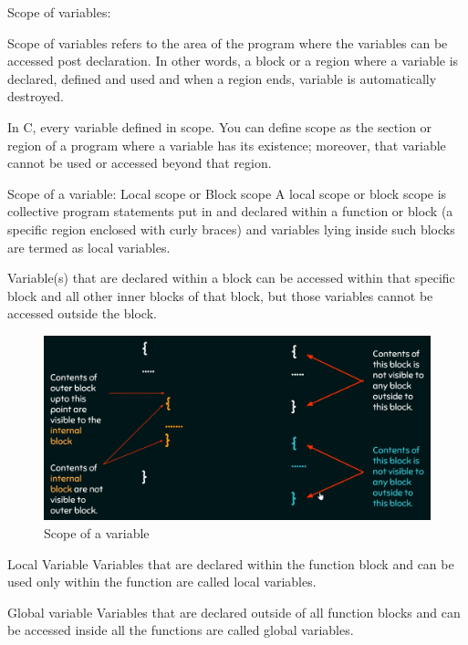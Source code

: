 Scope of variables: 

Scope of variables refers to the area of the program where the variables can be accessed post declaration. In other words, a block or a region where a variable is declared, defined and used and when a region ends, variable is automatically destroyed.

In C, every variable defined in scope. You can define scope as the section or region of a program where a variable has its existence; moreover, that variable cannot be used or accessed beyond that region.

Scope of a variable:   
Local scope or Block scope
A local scope or block scope is collective program statements put in and declared within a function or block (a specific region enclosed with curly braces) and variables lying inside such blocks are termed as local variables. 

Variable(s) that are declared within a block can be accessed within that specific block and all other inner blocks of that block, but those variables cannot be accessed outside the block.

\begin{figure}[H]
    \begin{center}
        \includegraphics[width=\textwidth]{images/variableScope.png}
        \caption{Scope of a variable}
        \label{variableScope}
    \end{center}
\end{figure}

Local Variable
Variables that are declared within the function block and can be used only within the function are called local variables.

Global variable
Variables that are declared outside of all function blocks and can be accessed inside all the functions are called global variables.

